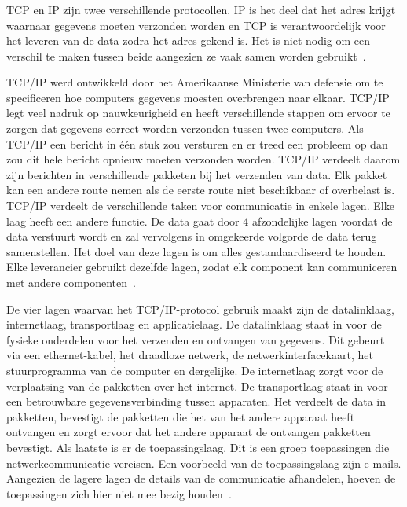 \subsubsection{}
\label{subsec:TCP/IP}
TCP en IP zijn twee verschillende protocollen. IP is het deel dat het adres krijgt waarnaar gegevens moeten verzonden worden en TCP is verantwoordelijk voor het leveren van de data zodra het adres gekend is. Het is niet nodig om een verschil te maken tussen beide aangezien ze vaak samen worden gebruikt~\autocite{Sharon2019}. 

TCP/IP werd ontwikkeld door het Amerikaanse Ministerie van defensie om te specificeren hoe computers gegevens moesten overbrengen naar elkaar. TCP/IP legt veel nadruk op nauwkeurigheid en heeft verschillende stappen om ervoor te zorgen dat gegevens correct worden verzonden tussen twee computers. Als TCP/IP een bericht in één stuk zou versturen en er treed een probleem op dan zou dit hele bericht opnieuw moeten verzonden worden. TCP/IP verdeelt daarom zijn berichten in verschillende pakketen bij het verzenden van data. Elk pakket kan een andere route nemen als de eerste route niet beschikbaar of overbelast is. TCP/IP verdeelt de verschillende taken voor communicatie in enkele lagen. Elke laag heeft een andere functie. De data gaat door 4 afzondelijke lagen voordat de data verstuurt wordt en zal vervolgens in omgekeerde volgorde de data terug samenstellen. Het doel van deze lagen is om alles gestandaardiseerd te houden. Elke leverancier gebruikt dezelfde lagen, zodat elk component kan communiceren met andere componenten~\autocite{Sharon2019}. 

De vier lagen waarvan het TCP/IP-protocol gebruik maakt zijn de datalinklaag, internetlaag, transportlaag en applicatielaag. De datalinklaag staat in voor de fysieke onderdelen voor het verzenden en ontvangen van gegevens. Dit gebeurt via een ethernet-kabel, het draadloze netwerk, de netwerkinterfacekaart, het stuurprogramma van de computer en dergelijke. De internetlaag zorgt voor de verplaatsing van de pakketten over het internet. De transportlaag staat in voor een betrouwbare gegevensverbinding tussen apparaten. Het verdeelt de data in pakketten, bevestigt de pakketten die het van het andere apparaat heeft ontvangen en zorgt ervoor dat het andere apparaat de ontvangen pakketten bevestigt. Als laatste is er de toepassingslaag. Dit is een groep toepassingen die netwerkcommunicatie vereisen. Een voorbeeld van de toepassingslaag zijn e-mails. Aangezien de lagere lagen de details van de communicatie afhandelen, hoeven de toepassingen zich hier niet mee bezig houden~\autocite{Sharon2019}. 


